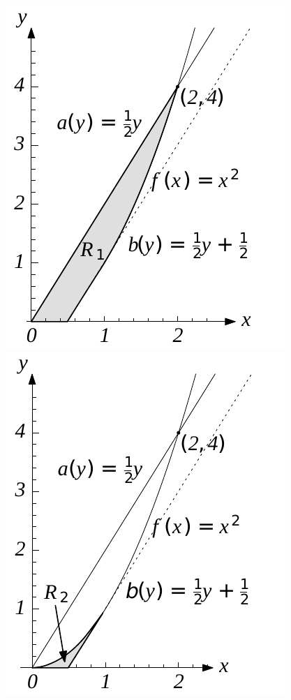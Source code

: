 \documentclass{article}
\theoremstyle{theorem}
\theoremstyle{definition}
\begin{document}
\begin{figure}
\centering
\begin{minipage}{.5\textwidth}
  \centering
  \includegraphics[width=0.9\linewidth]{fig20b.pdf}
\end{minipage}%
\begin{minipage}{.5\textwidth}
  \centering
  \includegraphics[width=0.9\linewidth]{fig20c.pdf}

\end{minipage}
\end{figure}
\end{document}
